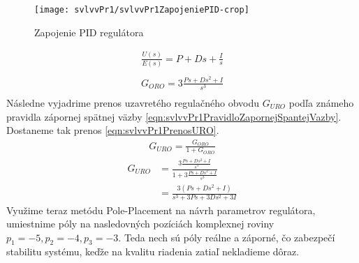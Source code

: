 \documentclass[../main.tex]{subfiles}
\begin{document}
	\begin{figure}[h!]
		\centering
		\texttt{[image: svlvvPr1/svlvvPr1ZapojeniePID-crop]}
		\caption{Zapojenie PID regulátora}
		\label{fig:svlvvPr1ZapojeinePIDNaLinSys}
	\end{figure}
	\begin{equation}
		\begin{aligned}
			\frac{U(s)}{E(s)} = P + Ds + \frac{I}{s} \\
		\end{aligned}
		\label{eqn:svlvvPr1PIDPrenos}
	\end{equation}
	\begin{equation}
	\begin{aligned}
	G_{ORO} = 3\frac{Ps + Ds^2 + I}{s^3} \\
	\end{aligned}
	\label{eqn:svlvvPr1PIDPrenosORO}
	\end{equation}
	Následne vyjadrime prenos uzavretého regulačného obvodu $G_{URO}$ podľa známeho pravidla zápornej spätnej väzby \cref{eqn:svlvvPr1PravidloZapornejSpantejVazby}. Dostaneme tak prenos \cref{eqn:svlvvPr1PrenosURO}.
	\begin{equation}
			\begin{aligned}
			G_{URO} = \frac{G_{ORO}}{1 + G_{ORO}}
			\end{aligned}
			\label{eqn:svlvvPr1PravidloZapornejSpantejVazby}
	\end{equation}
	\begin{equation}
		\begin{aligned}
		G_{URO} &= \frac{3\frac{Ps + Ds^2 + I}{s^3}}{1 + 3\frac{Ps + Ds^2 + I}{s^3}}  \\
		 		&= \frac{3(Ps + Ds^2 + I)}{s^3 + 3Ps + 3Ds^2 + 3I}
		\end{aligned}
		\label{eqn:svlvvPr1PrenosURO}
	\end{equation}
	Využime teraz metódu Pole-Placement na návrh parametrov regulátora, umiestnime póly na nasledovných pozíciách komplexnej roviny $p_1 = -5, p_2 = -4, p_3 = -3$. Teda nech sú póly reálne a záporné, čo zabezpečí stabilitu systému, keďže na kvalitu riadenia zatiaľ nekladieme dôraz.
\end{document}
